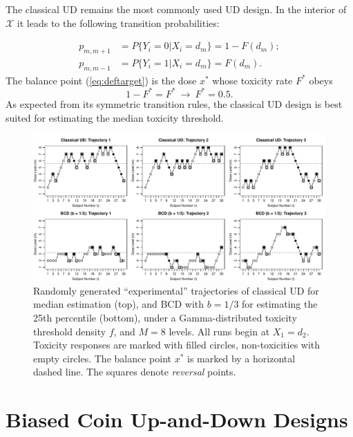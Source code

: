 The classical UD remains the most commonly used UD design. In the interior of $\mathcal{X}$ it leads to the following transition probabilities:

\begin{equation}
\begin{array}{rl}
p_{m,m+1}&=P\{Y_i=0|X_i=d_m\}=1-F(d_m);\\
p_{m,m-1}&=P\{Y_i=1|X_i=d_m\}=F(d_m).
\end{array}
\end{equation}
The balance point (\ref{eq:deftarget}) is the dose $x^*$ whose toxicity rate $F^*$ obeys
\begin{equation*}
1-F^*=F^*\ \longrightarrow \   F^*=0.5.
\end{equation*}
As expected from its symmetric transition rules, the classical UD design is best suited for estimating the median toxicity threshold.

\begin{figure}
\begin{center}
\includegraphics[scale=0.65]{Traject2}
\caption{Randomly generated ``experimental'' trajectories of classical UD for median estimation (top), and BCD with $b=1/3$ for estimating the 25th percentile (bottom), under a Gamma-distributed toxicity threshold density $f$, and $M=8$ levels. All runs begin at $X_1=d_2$. Toxicity responses are marked with filled circles, non-toxicities with empty circles. The balance point $x^*$ is marked by a horizontal dashed line. The squares denote \emph{reversal} points.}\label{fig:traject}
\end{center}
\end{figure}

\section{Biased Coin Up-and-Down Designs}

